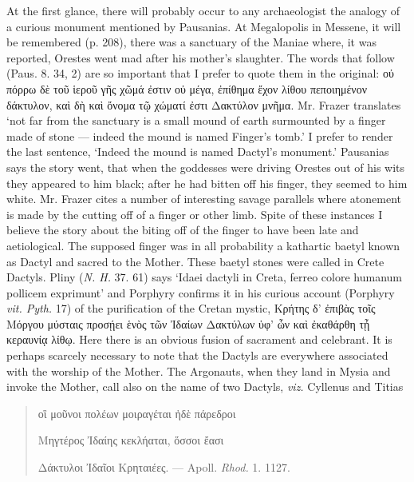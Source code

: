 \documentclass[a4paper, 11pt, oneside, polutonikogreek, english]{article}
\begin{document}
At the first glance, there will probably occur to any archaeologist the analogy of a curious monument mentioned by Pausanias. At Megalopolis in Messene, it will be remembered (p. 208), there was a sanctuary of the Maniae where, it was reported, Orestes went mad after his mother's slaughter. The words that follow (Paus. 8. 34, 2) are so important that I prefer to quote them in the original: οὐ πόρρω δὲ τοῦ ἱεροῦ γῆς χῶμά ἐστιν οὐ μέγα, ἐπίθημα ἔχον λίθου πεποιημένον δάκτυλον, καὶ δὴ καὶ ὄνομα τῷ χώματί ἐστι Δακτύλον μνῆμα. Mr. Frazer translates `not far from the sanctuary is a small mound of earth surmounted by a finger made of stone --- indeed the mound is named Finger's tomb.' I prefer to render the last sentence, `Indeed the mound is named Dactyl's monument.' Pausanias says the story went, that when the goddesses were driving Orestes out of his wits they appeared to him black; after he had bitten off his finger, they seemed to him white. Mr. Frazer cites a number of interesting savage parallels where atonement is made by the cutting off of a finger or other limb. Spite of these instances I believe the story about the biting off of the finger to have been late and aetiological. The supposed finger was in all probability a kathartic baetyl known as Dactyl and sacred to the Mother. These baetyl stones were called in Crete Dactyls. Pliny (\emph{N. H.} 37. 61) says `Idaei dactyli in Creta, ferreo colore humanum pollicem exprimunt' and Porphyry confirms it in his curious account (Porphyry \emph{vit. Pyth.} 17) of the purification of the Cretan mystic, Κρήτης δ' ἐπιβὰς τοῖς Μόργου μύσταις προσῄει ἑνὸς τῶν Ἰδαίων Δακτύλων ὑφ' ὧν καὶ ἐκαθάρθη τᾖ κεραυνίᾳ λίθῳ. Here there is an obvious fusion of sacrament and celebrant. It is perhaps scarcely necessary to note that the Dactyls are everywhere associated with the worship of the Mother. The Argonauts, when they land in Mysia and invoke the Mother, call also on the name of two Dactyls, \emph{viz.} Cyllenus and Titias
\begin{quotation}
οἳ μοῦνοι πολέων μοιραγέται ἠδὲ πάρεδροι

Μηγτέρος Ἰδαίης κεκλήαται, ὅσσοι ἔασι

Δάκτυλοι Ἰδαῖοι Κρηταιέες. --- Apoll. \emph{Rhod.} 1. 1127.
\end{quotation}
\end{document}
